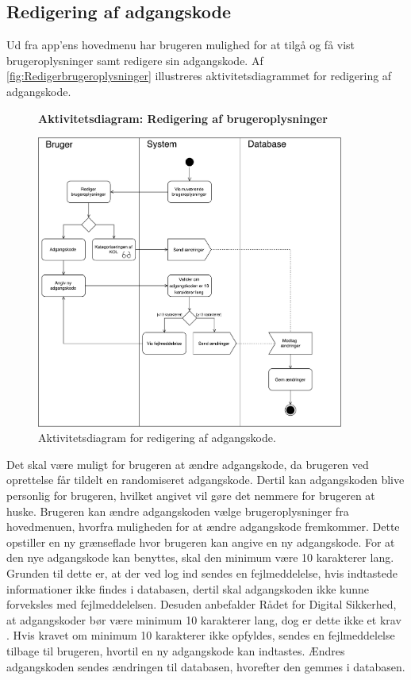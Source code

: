 \subsection*{Redigering af adgangskode} \label{sec:redigrering}
Ud fra app'ens hovedmenu har brugeren mulighed for at tilgå og få vist brugeroplysninger samt redigere sin adgangskode. Af \autoref{fig:Redigerbrugeroplysninger} illustreres aktivitetsdiagrammet for redigering af adgangskode.  

\begin{figure}[H]
\centering
\textbf{Aktivitetsdiagram: Redigering af brugeroplysninger}\par\medskip
\includegraphics[width=0.9\textwidth]{figures/aktivitetsdiagram/Redigerbrugeroplysninger}
\caption{Aktivitetsdiagram for redigering af adgangskode.}
\label{fig:Redigerbrugeroplysninger}
\end{figure}

\noindent
Det skal være muligt for brugeren at ændre adgangskode, da brugeren ved oprettelse får tildelt en randomiseret adgangskode. Dertil kan adgangskoden blive personlig for brugeren, hvilket angivet vil gøre det nemmere for brugeren at huske. 
Brugeren kan ændre adgangskoden vælge brugeroplysninger fra hovedmenuen, hvorfra muligheden for at ændre adgangskode fremkommer. Dette opstiller en ny grænseflade hvor brugeren kan angive en ny adgangskode.  
For at den nye adgangskode kan benyttes, skal den minimum være 10 karakterer lang. Grunden til dette er, at der ved log ind sendes en fejlmeddelelse, hvis indtastede informationer ikke findes i databasen, dertil skal adgangskoden ikke kunne forveksles med fejlmeddelelsen. Desuden anbefalder Rådet for Digital Sikkerhed, at adgangskoder bør være minimum 10 karakterer lang, dog er dette ikke et krav \citep{sikkerhed2015}.
Hvis kravet om minimum 10 karakterer ikke opfyldes, sendes en fejlmeddelelse tilbage til brugeren, hvortil en ny adgangskode kan indtastes. 
Ændres adgangskoden sendes ændringen til databasen, hvorefter den gemmes i databasen.